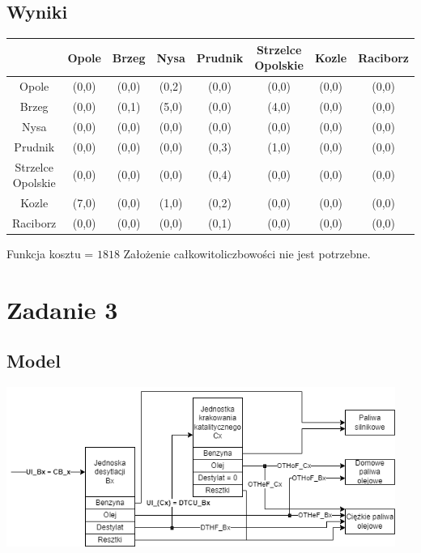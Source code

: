 \documentclass{article}
\begin{document}
\subsection{Wyniki}

\begin{center}
    \begin{tabular}{| c | c | c | c | c | c | c | c |}
        \hline
                & Opole & Brzeg & Nysa &  Prudnik & Strzelce Opolskie &  Kozle &  Raciborz\\ \hline
        Opole   & (0,0) & (0,0) & (0,2) & (0,0) & (0,0) & (0,0) & (0,0) \\ \hline
        Brzeg   & (0,0) & (0,1) & (5,0) & (0,0) & (4,0) & (0,0) & (0,0) \\ \hline
        Nysa    & (0,0) & (0,0) & (0,0) & (0,0) & (0,0) & (0,0) & (0,0) \\ \hline
        Prudnik & (0,0) & (0,0) & (0,0) & (0,3) & (1,0) & (0,0) & (0,0) \\ \hline
        Strzelce Opolskie       & (0,0) & (0,0) & (0,0) & (0,4) & (0,0) & (0,0) & (0,0) \\ \hline
        Kozle   & (7,0) & (0,0) & (1,0) & (0,2) & (0,0) & (0,0) & (0,0) \\ \hline
        Raciborz        & (0,0) & (0,0) & (0,0) & (0,1) & (0,0) & (0,0) & (0,0) \\ \hline
    \end{tabular}
\end{center}

Funkcja kosztu = $1818$
Założenie całkowitoliczbowości nie jest potrzebne.

\section{Zadanie 3}
\subsection{Model}
\begin{center}
    \includegraphics[width = 5in]{model.png}
\end{center}
\end{document}
